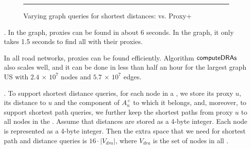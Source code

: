 \begin{figure}[t!]
\begin{center}
\end{center}
\caption{Varying graph queries  for shortest distances: \ah vs. Proxy+\ah}
\hrule
\label{fig:performance_dist_queries_ah}
\vspace{-2ex}
\end{figure}




.
In the \dblp graph, proxies can be found in about 6 seconds. In the \dblpone graph, it only takes 1.5 seconds to find all \dras with their proxies.

In all road networks, proxies can be found efficiently. Algorithm ${\mathsf{computeDRAs}}$ also scales well, and it can be done in less than half an hour for the largest graph US with $2.4$ $\times$ $10^7$ nodes and $5.7$ $\times$ $10^7$ edges.

.
To support shortest distance queries, for each node in a \dra, we store its proxy $u$, its distance to $u$ and the component of $A^{+}_u$ to which it belongs, and, moreover, to support shortest path queries, we further keep the shortest paths from proxy $u$ to all nodes in the \dra. Assume that distances are stored as a 4-byte integer. Each node is represented as a 4-byte integer. Then the extra space that we need for shortest path and distance queries is $16\cdot |V_{dra}|$, where $V_{dra}$ is the set of nodes in all \dras.

